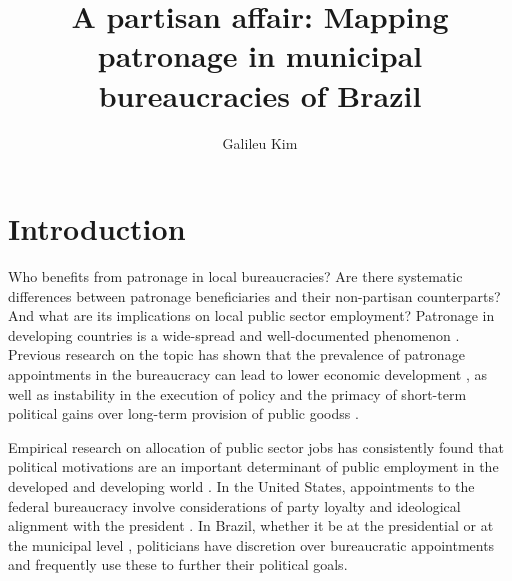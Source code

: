 \documentclass[12pt,a4paper]{article}
\title{A partisan affair: Mapping patronage in municipal bureaucracies of Brazil}
\author{Galileu Kim}
\affil{Princeton University}
\begin{document}
\maketitle


\newpage

\section{Introduction}
\label{sec:intro}

Who benefits from patronage in local bureaucracies? Are there systematic differences between patronage beneficiaries and their non-partisan counterparts? And what are its implications on local public sector employment? Patronage in developing countries is a wide-spread and well-documented phenomenon \citep{robinson2013political, grindle2012jobs}. Previous research on the topic has shown that the prevalence of patronage appointments in the bureaucracy can lead to lower economic development \citep{evans1999bureaucracy,kohli2004state}, as well as instability in the execution of policy and the primacy of short-term political gains over long-term provision of public goodss \citep{remmer2007political}.

Empirical research on allocation of public sector jobs has consistently found that political motivations are an important determinant of public employment in the developed and developing world \citep{finan2017personnel}. In the United States, appointments to the federal bureaucracy involve considerations of party loyalty and ideological alignment with the president \citep{lewis2010politics, hollibaugh2014presidents}. In Brazil, whether it be at the presidential \citep{pracca2011political} or at the municipal level \citep{colonnelli2018patronage,brollo2017victor}, politicians have discretion over bureaucratic appointments and frequently use these to further their political goals.
\end{document}

